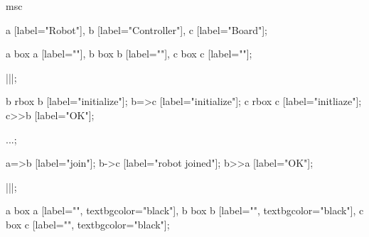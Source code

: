 \begin{msc}
msc
{

a [label="Robot"],
b [label="Controller"],
c [label="Board"];

a box a [label=""],
b box b [label=""],
c box c [label=""];

|||;

b rbox b [label="initialize"];
b=>c [label="initialize"];
c rbox c [label="initliaze"];
c>>b [label="OK"];

...;

a=>b [label="join"];
b->c [label="robot joined"];
b>>a [label="OK"];

|||;

a box a [label="", textbgcolor="black"],
b box b [label="", textbgcolor="black"],
c box c [label="", textbgcolor="black"];

}
\end{msc} 
